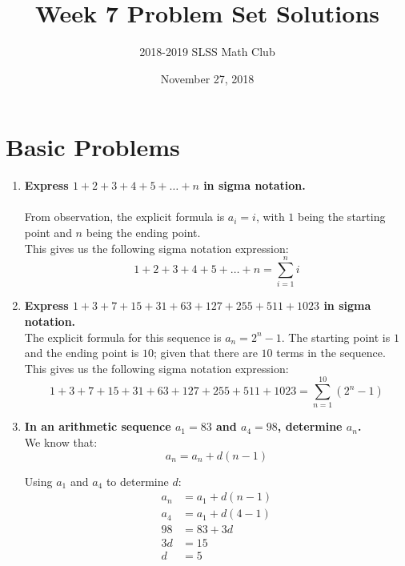 \documentclass[12pt]{article}
\title{Week 7 Problem Set Solutions\vspace{-3mm}}
\author{2018-2019 SLSS Math Club\vspace{-5mm}}
\date{November 27, 2018\vspace{-5mm}}
\begin{document}
\maketitle

\section*{Basic Problems}
\begin{enumerate}
    \item \textbf{Express $1 + 2 + 3 + 4 + 5 + \dots + n$ in sigma notation.} \\ \\
    From observation, the explicit formula is $a_i = i$, with $1$ being the starting point and $n$ being the ending point. \\
    
    This gives us the following sigma notation expression:
    \begin{equation*}
        1 + 2 + 3 + 4 + 5 + \dots + n = \sum_{i = 1}^n i
    \end{equation*}
    
    \item \textbf{Express $1 + 3 + 7 + 15 + 31 + 63 + 127 + 255 + 511 + 1023$ in sigma notation.} \\
    
    The explicit formula for this sequence is $a_n = 2^n - 1$. The starting point is $1$ and the ending point is $10$; given that there are $10$ terms in the sequence. \\
    
    This gives us the following sigma notation expression:
    \begin{equation*}
        1 + 3 + 7 + 15 + 31 + 63 + 127 + 255 + 511 + 1023 = \sum_{n = 1}^{10} (2^n - 1)
    \end{equation*}
    
    \item \textbf{In an arithmetic sequence $a_1 = 83$ and $a_4 = 98$, determine $a_n$.} \\
    
    We know that:
    \begin{equation*}
        a_n = a_n + d(n - 1)        
    \end{equation*}
    
    Using $a_1$ and $a_4$ to determine $d$:
    \begin{align*}
        a_n & = a_1 + d(n-1) \\
        a_4 & = a_1 + d(4 - 1) \\
        98 & = 83 + 3d \\
        3d & = 15 \\
        d & = 5
    \end{align*}
    

\end{enumerate}
\end{document}
